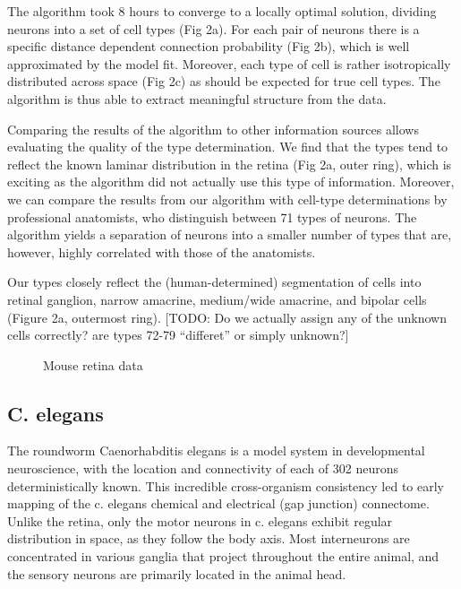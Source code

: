 \documentclass{article}
\begin{document}
The algorithm took 8 hours to converge to a locally optimal solution,
dividing neurons into a set of cell types (Fig 2a). For each pair of
neurons there is a specific distance dependent connection probability
(Fig 2b), which is well approximated by the model fit. Moreover, each
type of cell is rather isotropically distributed across space (Fig 2c)
as should be expected for true cell types. The algorithm is thus able
to extract meaningful structure from the data.

Comparing the results of the algorithm to other information sources
allows evaluating the quality of the type determination. We find that
the types tend to reflect the known laminar distribution in the retina
(Fig 2a, outer ring), which is exciting as the algorithm did not
actually use this type of information. Moreover, we can compare the
results from our algorithm with cell-type determinations by
professional anatomists, who distinguish between 71 types of
neurons. The algorithm yields a separation of neurons into a smaller
number of types that are, however, highly correlated with those of the
anatomists.

Our types closely reflect the (human-determined) segmentation of cells
into retinal ganglion, narrow amacrine, medium/wide amacrine, and
bipolar cells (Figure 2a, outermost ring). [TODO: Do we actually
assign any of the unknown cells correctly? are types 72-79 “differet”
or simply unknown?]





\begin{figure}
  \centering 
  \caption{Mouse retina data}
\end{figure}

\subsection{C. elegans}

The roundworm Caenorhabditis elegans is a model system in
developmental neuroscience, with the location and connectivity of each
of 302 neurons deterministically known. This incredible cross-organism
consistency led to early mapping of the c. elegans chemical and
electrical (gap junction) connectome. Unlike the retina, only the
motor neurons in c. elegans exhibit regular distribution in space, as
they follow the body axis. Most interneurons are concentrated in
various ganglia that project throughout the entire animal, and the
sensory neurons are primarily located in the animal head.
\end{document}
